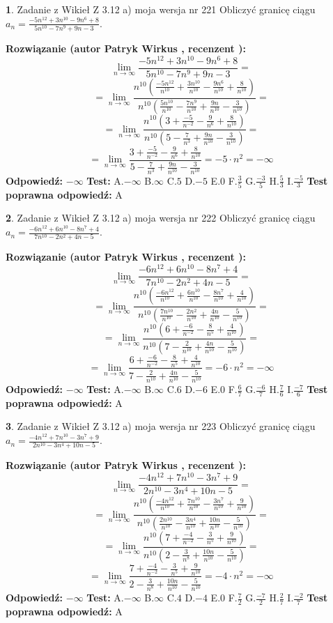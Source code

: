 \documentclass[12pt, a4paper]{article}
\theoremstyle{definition} %
\newtheorem{zad}{}
\newcommand{\zadStart}[1]{\begin{zad}#1\newline}
\newcommand{\zadStop}{\end{zad}}
\newcommand{\rozwStart}[2]{\noindent \textbf{Rozwiązanie (autor #1 , recenzent #2): }\newline}
\newcommand{\rozwStop}{\newline}
\newcommand{\odpStart}{\noindent \textbf{Odpowiedź:}\newline}
\newcommand{\odpStop}{\newline}
\newcommand{\testStart}{\noindent \textbf{Test:}\newline}
\newcommand{\testStop}{\newline}
\newcommand{\kluczStart}{\noindent \textbf{Test poprawna odpowiedź:}\newline}
\newcommand{\kluczStop}{\newline}
\begin{document}
\zadStart{Zadanie z Wikieł Z 3.12 a) moja wersja nr 221}
Obliczyć granicę ciągu $a_{n}=\frac{-5n^{12}+3n^{10}-9n^{6}+8}{5n^{10}-7n^{9}+9n-3}$.
\zadStop
\rozwStart{Patryk Wirkus}{}
$$\lim\limits_{n\to\infty}\frac{-5n^{12}+3n^{10}-9n^{6}+8}{5n^{10}-7n^{9}+9n-3}=$$
$$=\lim\limits_{n\to\infty}\frac{n^{10}\left(\frac{-5n^{12}}{n^{10}}+\frac{3n^{10}}{n^{10}}-\frac{9n^{6}}{n^{10}}+\frac{8}{n^{10}}\right)}{n^{10}\left(\frac{5n^{10}}{n^{10}}-\frac{7n^{9}}{n^{10}}+\frac{9n}{n^{10}}-\frac{3}{n^{10}}\right)}=$$
$$=\lim\limits_{n\to\infty}\frac{n^{10}\left(3+\frac{-5}{n^{-2}}-\frac{9}{n^{6}}+\frac{8}{n^{10}}\right)}
{n^{10}\left(5-\frac{7}{n^{3}}+\frac{9n}{n^{10}}-\frac{3}{n^{10}}\right)}=$$
$$=\lim\limits_{n\to\infty}\frac{3+\frac{-5}{n^{-2}}-\frac{9}{n^{6}}+\frac{8}{n^{10}}}{5-\frac{7}{n^{3}}+\frac{9n}{n^{10}}-\frac{3}{n^{10}}}=-5\cdot n^{2} = -\infty$$
\rozwStop
\odpStart
$-\infty$
\odpStop
\testStart
A.$-\infty$
B.$\infty$
C.$5$
D.$-5$
E.$0$
F.$\frac{3}{5}$
G.$\frac{-3}{5}$
H.$\frac{5}{3}$
I.$\frac{-5}{3}$
\testStop
\kluczStart
A
\kluczStop



\zadStart{Zadanie z Wikieł Z 3.12 a) moja wersja nr 222}
Obliczyć granicę ciągu $a_{n}=\frac{-6n^{12}+6n^{10}-8n^{7}+4}{7n^{10}-2n^{2}+4n-5}$.
\zadStop
\rozwStart{Patryk Wirkus}{}
$$\lim\limits_{n\to\infty}\frac{-6n^{12}+6n^{10}-8n^{7}+4}{7n^{10}-2n^{2}+4n-5}=$$
$$=\lim\limits_{n\to\infty}\frac{n^{10}\left(\frac{-6n^{12}}{n^{10}}+\frac{6n^{10}}{n^{10}}-\frac{8n^{7}}{n^{10}}+\frac{4}{n^{10}}\right)}{n^{10}\left(\frac{7n^{10}}{n^{10}}-\frac{2n^{2}}{n^{10}}+\frac{4n}{n^{10}}-\frac{5}{n^{10}}\right)}=$$
$$=\lim\limits_{n\to\infty}\frac{n^{10}\left(6+\frac{-6}{n^{-2}}-\frac{8}{n^{5}}+\frac{4}{n^{10}}\right)}
{n^{10}\left(7-\frac{2}{n^{10}}+\frac{4n}{n^{10}}-\frac{5}{n^{10}}\right)}=$$
$$=\lim\limits_{n\to\infty}\frac{6+\frac{-6}{n^{-2}}-\frac{8}{n^{5}}+\frac{4}{n^{10}}}{7-\frac{2}{n^{10}}+\frac{4n}{n^{10}}-\frac{5}{n^{10}}}=-6\cdot n^{2} = -\infty$$
\rozwStop
\odpStart
$-\infty$
\odpStop
\testStart
A.$-\infty$
B.$\infty$
C.$6$
D.$-6$
E.$0$
F.$\frac{6}{7}$
G.$\frac{-6}{7}$
H.$\frac{7}{6}$
I.$\frac{-7}{6}$
\testStop
\kluczStart
A
\kluczStop



\zadStart{Zadanie z Wikieł Z 3.12 a) moja wersja nr 223}
Obliczyć granicę ciągu $a_{n}=\frac{-4n^{12}+7n^{10}-3n^{7}+9}{2n^{10}-3n^{4}+10n-5}$.
\zadStop
\rozwStart{Patryk Wirkus}{}
$$\lim\limits_{n\to\infty}\frac{-4n^{12}+7n^{10}-3n^{7}+9}{2n^{10}-3n^{4}+10n-5}=$$
$$=\lim\limits_{n\to\infty}\frac{n^{10}\left(\frac{-4n^{12}}{n^{10}}+\frac{7n^{10}}{n^{10}}-\frac{3n^{7}}{n^{10}}+\frac{9}{n^{10}}\right)}{n^{10}\left(\frac{2n^{10}}{n^{10}}-\frac{3n^{4}}{n^{10}}+\frac{10n}{n^{10}}-\frac{5}{n^{10}}\right)}=$$
$$=\lim\limits_{n\to\infty}\frac{n^{10}\left(7+\frac{-4}{n^{-2}}-\frac{3}{n^{5}}+\frac{9}{n^{10}}\right)}
{n^{10}\left(2-\frac{3}{n^{8}}+\frac{10n}{n^{10}}-\frac{5}{n^{10}}\right)}=$$
$$=\lim\limits_{n\to\infty}\frac{7+\frac{-4}{n^{-2}}-\frac{3}{n^{5}}+\frac{9}{n^{10}}}{2-\frac{3}{n^{8}}+\frac{10n}{n^{10}}-\frac{5}{n^{10}}}=-4\cdot n^{2} = -\infty$$
\rozwStop
\odpStart
$-\infty$
\odpStop
\testStart
A.$-\infty$
B.$\infty$
C.$4$
D.$-4$
E.$0$
F.$\frac{7}{2}$
G.$\frac{-7}{2}$
H.$\frac{2}{7}$
I.$\frac{-2}{7}$
\testStop
\kluczStart
A
\kluczStop
\end{document}
